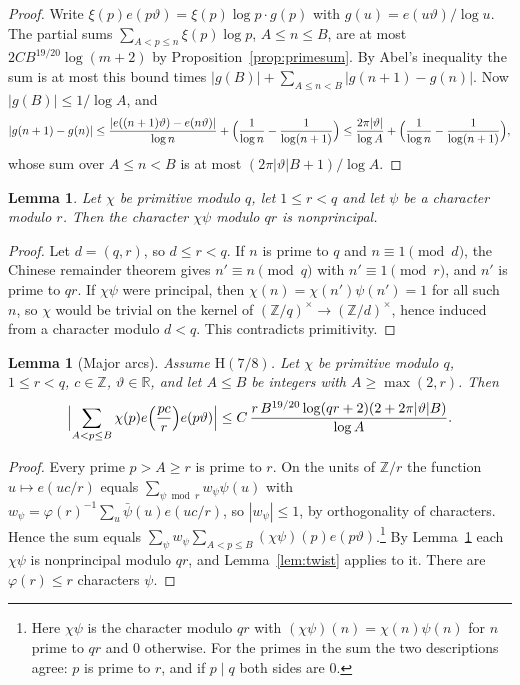 \documentclass[11pt]{amsart}
\newtheorem{lemma}[theorem]{Lemma}
\theoremstyle{definition}
\theoremstyle{remark}
\numberwithin{equation}{section}
\newcommand{\e}{e}
\begin{document}
\begin{proof}
Write $\xi(p)\e(p\vartheta)=\xi(p)\log p\cdot g(p)$ with $g(u)=\e(u\vartheta)/\log u$.
The partial sums $\sum_{A<p\le n}\xi(p)\log p$, $A\le n\le B$, are at most
$2CB^{19/20}\log(m+2)$ by Proposition~\ref{prop:primesum}. By Abel's
inequality the sum is at most this bound times $|g(B)|+\sum_{A\le n<B}|g(n+1)-g(n)|$.
Now $|g(B)|\le1/\log A$, and
\[
|g(n+1)-g(n)|\le\frac{|\e((n+1)\vartheta)-\e(n\vartheta)|}{\log n}+\Bigl(\frac1{\log
n}-\frac1{\log(n+1)}\Bigr)\le\frac{2\pi|\vartheta|}{\log A}+\Bigl(\frac1{\log
n}-\frac1{\log(n+1)}\Bigr),
\]
whose sum over $A\le n<B$ is at most $(2\pi|\vartheta|B+1)/\log A$.
\end{proof}

\begin{lemma}\label{lem:twistprim}
Let $\chi$ be primitive modulo $q$, let $1\le r<q$ and let $\psi$ be a
character modulo $r$. Then the character $\chi\psi$ modulo $qr$ is nonprincipal.
\end{lemma}

\begin{proof}
Let $d=(q,r)$, so $d\le r<q$. If $n$ is prime to $q$ and $n\equiv1\pmod d$, the
Chinese remainder theorem gives $n'\equiv n\pmod q$ with $n'\equiv1\pmod r$, and
$n'$ is prime to $qr$. If $\chi\psi$ were principal, then
$\chi(n)=\chi(n')\psi(n')=1$ for all such $n$, so $\chi$ would be trivial on the
kernel of $(\mathbb Z/q)^\times\to(\mathbb Z/d)^\times$, hence induced from a
character modulo $d<q$. This contradicts primitivity.
\end{proof}

\begin{lemma}[Major arcs]\label{lem:majorprime}
Assume $\mathrm H(7/8)$. Let $\chi$ be primitive modulo $q$, $1\le r<q$, $c\in\mathbb
Z$, $\vartheta\in\mathbb R$, and let $A\le B$ be integers with $A\ge\max(2,r)$. Then
\[
\Bigl|\sum_{A<p\le B}\chi(p)\e\Bigl(\frac{pc}r\Bigr)\e(p\vartheta)\Bigr|\le
C\,\frac{r\,B^{19/20}\log(qr+2)(2+2\pi|\vartheta|B)}{\log A}.
\]
\end{lemma}

\begin{proof}
Every prime $p>A\ge r$ is prime to $r$. On the units of $\mathbb Z/r$ the
function $u\mapsto\e(uc/r)$ equals $\sum_{\psi\bmod r}w_\psi\psi(u)$ with
$w_\psi=\varphi(r)^{-1}\sum_{u}\bar\psi(u)\e(uc/r)$, so $|w_\psi|\le1$, by
orthogonality of characters. Hence the sum equals
$\sum_\psi w_\psi\sum_{A<p\le B}(\chi\psi)(p)\e(p\vartheta)$.\footnote{Here
$\chi\psi$ is the character modulo $qr$ with $(\chi\psi)(n)=\chi(n)\psi(n)$ for
$n$ prime to $qr$ and $0$ otherwise. For the primes in the sum the two
descriptions agree: $p$ is prime to $r$, and if $p\mid q$ both sides are $0$.}
By Lemma~\ref{lem:twistprim} each $\chi\psi$ is nonprincipal modulo $qr$, and
Lemma~\ref{lem:twist} applies to it. There are $\varphi(r)\le r$ characters $\psi$.
\end{proof}
\end{document}
